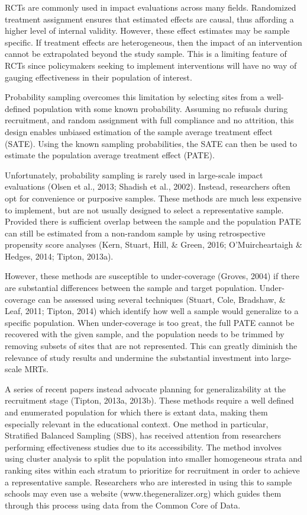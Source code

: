 \documentclass[man,floatsintext]{apa6}
\begin{document}
RCTs are commonly used in impact evaluations across many fields. Randomized treatment assignment ensures that estimated effects are causal, thus affording a higher level of internal validity. However, these effect estimates may be sample specific. If treatment effects are heterogeneous, then the impact of an intervention cannot be extrapolated beyond the study sample. This is a limiting feature of RCTs since policymakers seeking to implement interventions will have no way of gauging effectiveness in their population of interest.

Probability sampling overcomes this limitation by selecting sites from a well-defined population with some known probability. Assuming no refusals during recruitment, and random assignment with full compliance and no attrition, this design enables unbiased estimation of the sample average treatment effect (SATE). Using the known sampling probabilities, the SATE can then be used to estimate the population average treatment effect (PATE).

Unfortunately, probability sampling is rarely used in large-scale impact evaluations (Olsen et al., 2013; Shadish et al., 2002). Instead, researchers often opt for convenience or purposive samples. These methods are much less expensive to implement, but are not usually designed to select a representative sample. Provided there is sufficient overlap between the sample and the population PATE can still be estimated from a non-random sample by using retrospective propensity score analyses (Kern, Stuart, Hill, \& Green, 2016; O'Muircheartaigh \& Hedges, 2014; Tipton, 2013a).

However, these methods are susceptible to under-coverage (Groves, 2004) if there are substantial differences between the sample and target population. Under-coverage can be assessed using several techniques (Stuart, Cole, Bradshaw, \& Leaf, 2011; Tipton, 2014) which identify how well a sample would generalize to a specific population. When under-coverage is too great, the full PATE cannot be recovered with the given sample, and the population needs to be trimmed by removing subsets of sites that are not represented. This can greatly diminish the relevance of study results and undermine the substantial investment into large-scale MRTs.

A series of recent papers instead advocate planning for generalizability at the recruitment stage (Tipton, 2013a, 2013b). These methods require a well defined and enumerated population for which there is extant data, making them especially relevant in the educational context. One method in particular, Stratified Balanced Sampling (SBS), has received attention from researchers performing effectiveness studies due to its accessibility. The method involves using cluster analysis to split the population into smaller homogeneous strata and ranking sites within each stratum to prioritize for recruitment in order to achieve a representative sample. Researchers who are interested in using this to sample schools may even use a website (www.thegeneralizer.org) which guides them through this process using data from the Common Core of Data.
\end{document}
